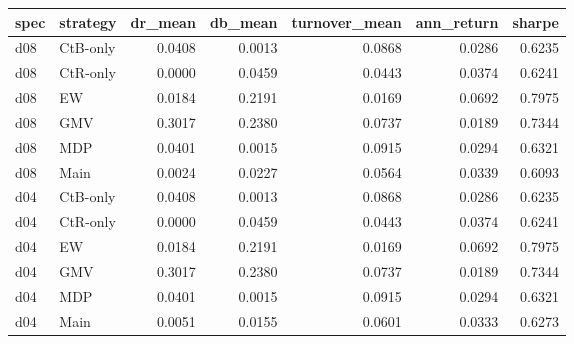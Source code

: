 \begin{tabular}{llrrrrr}
\toprule
spec & strategy & dr_mean & db_mean & turnover_mean & ann_return & sharpe \\
\midrule
d08 & CtB-only & 0.0408 & 0.0013 & 0.0868 & 0.0286 & 0.6235 \\
d08 & CtR-only & 0.0000 & 0.0459 & 0.0443 & 0.0374 & 0.6241 \\
d08 & EW & 0.0184 & 0.2191 & 0.0169 & 0.0692 & 0.7975 \\
d08 & GMV & 0.3017 & 0.2380 & 0.0737 & 0.0189 & 0.7344 \\
d08 & MDP & 0.0401 & 0.0015 & 0.0915 & 0.0294 & 0.6321 \\
d08 & Main & 0.0024 & 0.0227 & 0.0564 & 0.0339 & 0.6093 \\
d04 & CtB-only & 0.0408 & 0.0013 & 0.0868 & 0.0286 & 0.6235 \\
d04 & CtR-only & 0.0000 & 0.0459 & 0.0443 & 0.0374 & 0.6241 \\
d04 & EW & 0.0184 & 0.2191 & 0.0169 & 0.0692 & 0.7975 \\
d04 & GMV & 0.3017 & 0.2380 & 0.0737 & 0.0189 & 0.7344 \\
d04 & MDP & 0.0401 & 0.0015 & 0.0915 & 0.0294 & 0.6321 \\
d04 & Main & 0.0051 & 0.0155 & 0.0601 & 0.0333 & 0.6273 \\
\bottomrule
\end{tabular}
